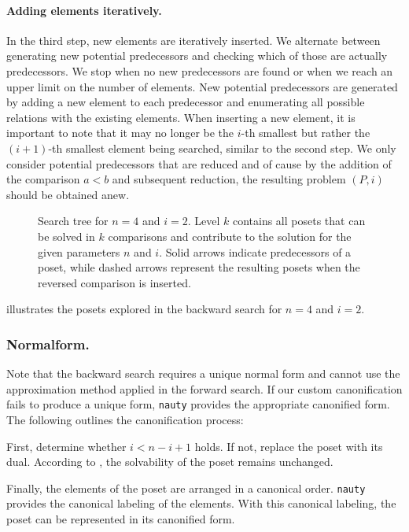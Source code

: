 \documentclass[twoside,leqno,twocolumn]{article}
\begin{document}
\paragraph{Adding elements iteratively.}
In the third step, new elements are iteratively inserted.
We alternate between generating new potential predecessors and checking which of those are actually predecessors.
We stop when no new predecessors are found or when we reach an upper limit on the number of elements.
New potential predecessors are generated by adding a new element to each predecessor and enumerating all possible relations with the existing elements.
When inserting a new element, it is important to note that it may no longer be the $i$-th smallest but rather the $(i + 1)$-th smallest element being searched, similar to the second step.
We only consider potential predecessors that are reduced and of cause by the addition of the comparison $a < b$ and subsequent reduction, the resulting problem $(P, i)$ should be obtained anew.

\begin{figure}[!b]
  \centering
  
  \caption{Search tree for $n = 4$ and $i = 2$.
    Level $k$ contains all posets that can be solved in $k$ comparisons and contribute to the solution for the given parameters $n$ and $i$.
    Solid arrows indicate predecessors of a poset, while dashed arrows represent the resulting posets when the reversed comparison is inserted.}
  \label{fig:backward-search-tree}
\end{figure}

 illustrates the posets explored in the backward search for $n = 4$ and $i = 2$.

\subsubsection{Normalform.} \label{sec:backward:normal_form}
Note that the backward search requires a unique normal form and cannot use the approximation method applied in the forward search.
If our custom canonification fails to produce a unique form, \texttt{nauty} provides the appropriate canonified form.
The following outlines the canonification process:

First, determine whether $i < n - i + 1$ holds.
If not, replace the poset with its dual.
According to , the solvability of the poset remains unchanged.

Finally, the elements of the poset are arranged in a canonical order.
\texttt{nauty} provides the canonical labeling of the elements.
With this canonical labeling, the poset can be represented in its canonified form.
\end{document}
